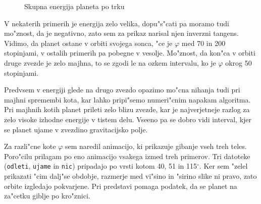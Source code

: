 \documentclass[a4paper,10pt]{article}
\renewcommand{\phi}{\varphi}
\begin{document}
\begin{figure}[H]
 \centering
 
 \caption{Skupna energija planeta po trku}
 \label{fig:energije}
\end{figure}

V nekaterih primerih je energija zelo velika, dopu"s"cati pa moramo tudi mo"znost, da je negativno, zato sem za prikaz narisal njen inverzni tangens. Vidimo, da planet ostane v orbiti svojega sonca, "ce je $\phi$ med 70 in 200 stopinjami, v ostalih primerih pa pobegne v vesolje. Mo"znost, da kon"ca v orbiti druge zvezde je zelo majhna, to se zgodi le na ozkem intervalu, ko je $\phi$ okrog 50 stopinjami. 

Predvsem v energiji glede na drugo zvezdo opazimo mo"cna nihanja tudi pri majhni spremembi kota, kar lahko pripi"semo numeri"cnim napakam algoritma. Pri majhnih kotih planet prileti zelo blizu zvezde, kar je najverjetneje razlog za zelo visoke izhodne energije v tistem delu. Vseeno pa se dobro vidi interval, kjer se planet ujame v zvezdino gravitacijsko polje. 

Za razli"cne kote $\varphi$ sem naredil animacijo, ki prikazuje gibanje vseh treh teles. Poro"cilu prilagam po eno animacijo vsakega izmed treh primerov. Tri datoteke (\texttt{odleti}, \texttt{ujame} in \texttt{nic}) pripadajo po vrsti kotom 40, 51 in 115$^\circ$. Ker sem "zelel prikazati "cim dalj"se obdobje, razmerje med vi"sino in "sirino slike ni pravo, zato orbite izgledajo pokvarjene. Pri predstavi pomaga podatek, da se planet na za"cetku giblje po kro"znici. 

 
\end{document}
